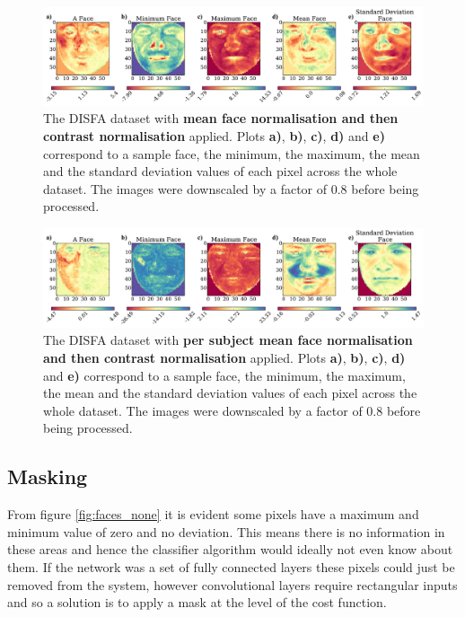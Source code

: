       \begin{figure}[!h] \centering
      \includegraphics[width =\hsize]{figures/faces_contrast_face.pdf}
      \caption{The DISFA dataset with {\bf mean face normalisation and then contrast normalisation} applied.
      Plots {\bf a)}, {\bf b)}, {\bf c)}, {\bf d)} and {\bf e)}
      correspond to a sample face, the minimum, the maximum,
      the mean and the standard deviation values of each pixel across
      the whole dataset. The images were downscaled by a factor of 0.8 before being processed.}
      \label{fig:faces_contrast_face} \end{figure}

      \begin{figure}[!h] \centering
      \includegraphics[width =\hsize]{figures/faces_per_subject_contrast_face.pdf}
      \caption{The DISFA dataset with {\bf per subject mean face normalisation and then contrast normalisation} applied.
      Plots {\bf a)}, {\bf b)}, {\bf c)}, {\bf d)} and {\bf e)}
      correspond to a sample face, the minimum, the maximum,
      the mean and the standard deviation values of each pixel across
      the whole dataset. The images were downscaled by a factor of 0.8 before being processed.}
      \label{fig:faces_per_subject_contrast_face} \end{figure}

    \subsection{Masking} \label{sec:mask}
      From figure \ref{fig:faces_none} it is evident some pixels have a maximum and minimum value
      of zero and no deviation. This means there is no information in these areas and hence
      the classifier algorithm would ideally not even know about them. If the network was a set of fully connected layers
      these pixels could just be removed from the system, however convolutional layers require
      rectangular inputs and so a solution is to apply a mask at the level of the cost function.


